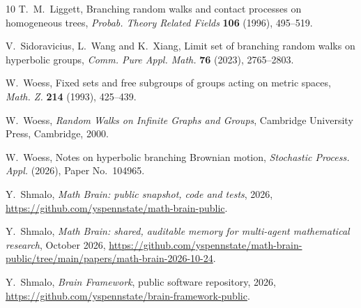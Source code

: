 \documentclass[11pt]{amsart}
\theoremstyle{definition}
\theoremstyle{remark}
\numberwithin{equation}{section}
\newcommand{\1}{\mathbf 1}
\begin{document}
\begin{thebibliography}{10}
T.~M.~Liggett, Branching random walks and contact processes on homogeneous trees, \emph{Probab. Theory Related Fields} \textbf{106} (1996), 495--519.

V.~Sidoravicius, L.~Wang and K.~Xiang, Limit set of branching random walks on hyperbolic groups, \emph{Comm. Pure Appl. Math.} \textbf{76} (2023), 2765--2803.

W.~Woess, Fixed sets and free subgroups of groups acting on metric spaces, \emph{Math. Z.} \textbf{214} (1993), 425--439.

W.~Woess, \emph{Random Walks on Infinite Graphs and Groups}, Cambridge University Press, Cambridge, 2000.

W.~Woess, Notes on hyperbolic branching Brownian motion, \emph{Stochastic Process. Appl.} (2026), Paper No.~104965.

 Y.~Shmalo, \emph{Math Brain: public snapshot, code and tests}, 2026, \url{https://github.com/yspennstate/math-brain-public}.

 Y.~Shmalo, \emph{Math Brain: shared, auditable memory for multi-agent mathematical research}, October 2026, \url{https://github.com/yspennstate/math-brain-public/tree/main/papers/math-brain-2026-10-24}.

 Y.~Shmalo, \emph{Brain Framework}, public software repository, 2026, \url{https://github.com/yspennstate/brain-framework-public}.

\end{thebibliography}
\end{document}

